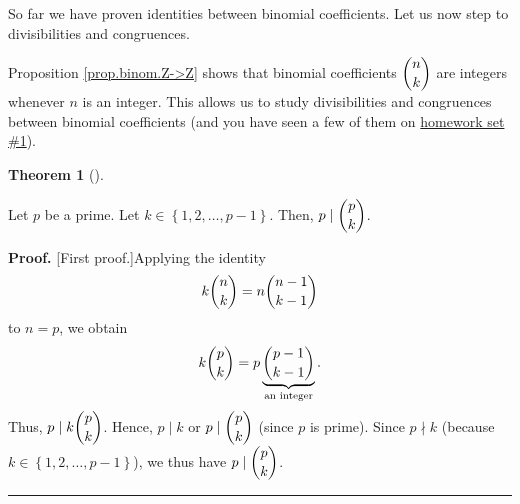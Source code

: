 \documentclass[numbers=enddot,12pt,final,onecolumn,notitlepage]{scrartcl}%
\numberwithin{exer}{subsection}
\theoremstyle{definition}
\newtheorem{theo}{Theorem}[subsection]
\newenvironment{theorem}[1][]
{\begin{theo}[#1]\begin{leftbar}}
{\end{leftbar}\end{theo}}
\newenvironment{proof}[1][Proof]{\noindent\textbf{#1.} }{\ \rule{0.5em}{0.5em}}
\begin{document}
So far we have proven identities between binomial coefficients. Let us now
step to divisibilities and congruences.

Proposition \ref{prop.binom.Z->Z} shows that binomial coefficients $\dbinom
{n}{k}$ are integers whenever $n$ is an integer. This allows us to study
divisibilities and congruences between binomial coefficients (and you have
seen a few of them on
\href{http://www-users.math.umn.edu/~dgrinber/19s/hw1s.pdf}{homework set \#1}).

\begin{theorem}
\label{thm.binom.p|bin}Let $p$ be a prime. Let $k\in\left\{  1,2,\ldots
,p-1\right\}  $. Then, $p\mid\dbinom{p}{k}$.
\end{theorem}

\begin{proof}
[First proof.]Applying the identity%
\[
k\dbinom{n}{k}=n\dbinom{n-1}{k-1}%
\]
to $n=p$, we obtain%
\[
k\dbinom{p}{k}=p\underbrace{\dbinom{p-1}{k-1}}_{\text{an integer}}.
\]
Thus, $p\mid k\dbinom{p}{k}$. Hence, $p\mid k$ or $p\mid\dbinom{p}{k}$ (since
$p$ is prime). Since $p\nmid k$ (because $k\in\left\{  1,2,\ldots,p-1\right\}
$), we thus have $p\mid\dbinom{p}{k}$.
\end{proof}
\end{document}
